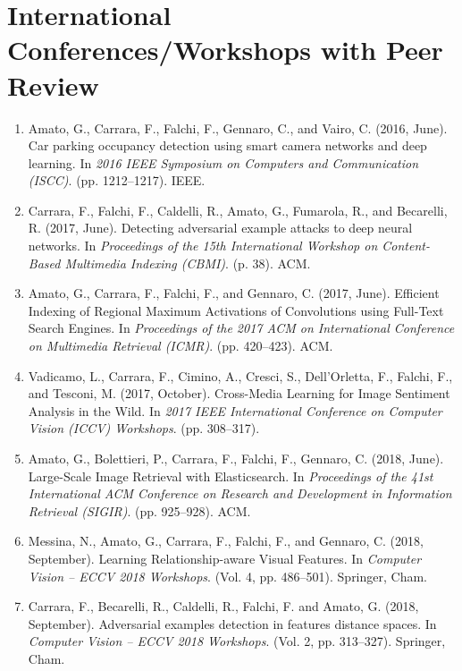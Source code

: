 \section*{International Conferences/Workshops with Peer Review}
\begin{enumerate}
    \item Amato, G., Carrara, F., Falchi, F., Gennaro, C., and Vairo, C. (2016, June). Car parking occupancy detection using smart camera networks and deep learning. In \emph{2016 IEEE Symposium on Computers and Communication (ISCC)}. (pp. 1212--1217). IEEE.
    \item Carrara, F., Falchi, F., Caldelli, R., Amato, G., Fumarola, R., and Becarelli, R. (2017, June). Detecting adversarial example attacks to deep neural networks. In \emph{Proceedings of the 15th International Workshop on Content-Based Multimedia Indexing (CBMI)}. (p. 38). ACM.
    \item Amato, G., Carrara, F., Falchi, F., and Gennaro, C. (2017, June). Efficient Indexing of Regional Maximum Activations of Convolutions using Full-Text Search Engines. In \emph{Proceedings of the 2017 ACM on International Conference on Multimedia Retrieval (ICMR)}. (pp. 420--423). ACM.
    \item Vadicamo, L., Carrara, F., Cimino, A., Cresci, S., Dell’Orletta, F., Falchi, F., and Tesconi, M. (2017, October). Cross-Media Learning for Image Sentiment Analysis in the Wild. In \emph{2017 IEEE International Conference on Computer Vision (ICCV) Workshops}. (pp. 308--317).
    \item Amato, G., Bolettieri, P., Carrara, F., Falchi, F., Gennaro, C. (2018, June). Large-Scale Image Retrieval with Elasticsearch. In \emph{Proceedings of the 41st International ACM Conference on Research and Development in Information Retrieval (SIGIR)}. (pp.  925--928). ACM.
    \item Messina, N., Amato, G., Carrara, F., Falchi, F., and Gennaro, C. (2018, September). Learning Relationship-aware Visual Features. In \emph{Computer Vision -- ECCV 2018 Workshops}. (Vol. 4, pp. 486--501). Springer, Cham.
    \item Carrara, F., Becarelli, R., Caldelli, R., Falchi, F. and Amato, G. (2018, September). Adversarial examples detection in features distance spaces. In \emph{Computer Vision -- ECCV 2018 Workshops}. (Vol. 2, pp. 313--327). Springer, Cham.
\end{enumerate}

